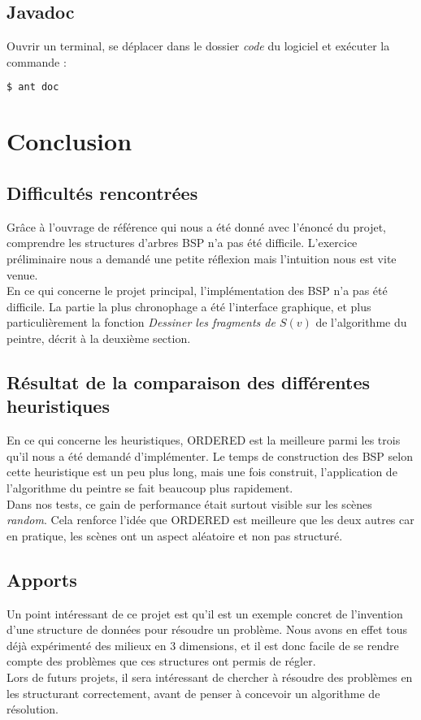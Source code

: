 \documentclass[11pts]{article}
\begin{document}
\subsection*{Javadoc}
Ouvrir un terminal, se déplacer dans le dossier \emph{code} du logiciel et exécuter la commande :
\begin{lstlisting}[language=bash]
$ ant doc
\end{lstlisting}


\newpage
\section{Conclusion}
\subsection*{Difficultés rencontrées}
Grâce à l'ouvrage de référence qui nous a été donné avec l'énoncé du projet, comprendre les structures d'arbres BSP n'a pas été difficile. L'exercice préliminaire nous a demandé une petite réflexion mais l'intuition nous est vite venue.\\
En ce qui concerne le projet principal, l'implémentation des BSP n'a pas été difficile. La partie la plus chronophage a été l'interface graphique, et plus particulièrement la fonction \emph{Dessiner les fragments de $S(v)$} de l'algorithme du peintre, décrit à la deuxième section.
\subsection*{Résultat de la comparaison des différentes heuristiques}
En ce qui concerne les heuristiques, ORDERED est la meilleure parmi les trois qu'il nous a été demandé d'implémenter. Le temps de construction des BSP selon cette heuristique est un peu plus long, mais une fois construit, l'application de l'algorithme du peintre se fait beaucoup plus rapidement.\\
Dans nos tests, ce gain de performance était surtout visible sur les scènes \emph{random}. Cela renforce l'idée que ORDERED est meilleure que les deux autres car en pratique, les scènes ont un aspect aléatoire et non pas structuré.
\subsection*{Apports}
Un point intéressant de ce projet est qu'il est un exemple concret de l'invention d'une structure de données pour résoudre un problème. Nous avons en effet tous déjà expérimenté des milieux en 3 dimensions, 
et il est donc facile de se rendre compte des problèmes que ces structures ont permis de régler.\\
Lors de futurs projets, il sera intéressant de chercher à résoudre des problèmes en les structurant correctement, avant de penser à concevoir un algorithme de résolution.
\end{document}
